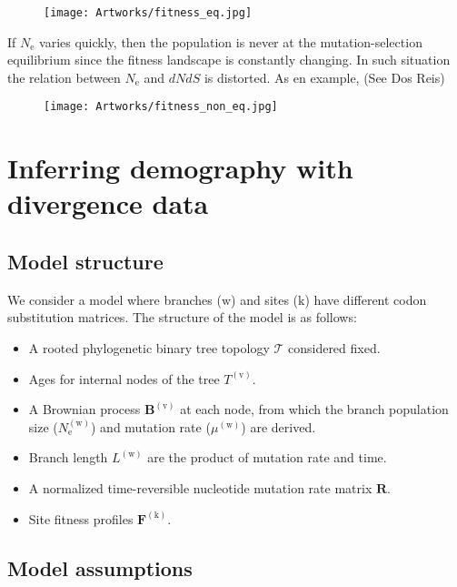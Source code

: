 \documentclass{article}
\newcommand{\site}{\text{k}}
\newcommand{\branch}{\text{w}}
\newcommand{\node}{\text{v}}
\newcommand{\e}{\mathrm{e}}
\newcommand{\Ne}{N_\e}
\newcommand{\dnds}{dNdS}
\newcommand{\Tree}{\mathcal{T}}
\newcommand{\brownian}{\bm{B}}
\newcommand{\mutmatrix}{R}
\newcommand{\Mutmatrix}{\bm{\mutmatrix}}
\begin{document}
\begin{figure}[H]
	\centering
	\texttt{[image: Artworks/fitness\_eq.jpg]}
\end{figure}

If $\Ne$ varies quickly, then the population is never at the mutation-selection equilibrium since the fitness landscape is constantly changing.
In such situation the relation between $\Ne$ and $\dnds$ is distorted.
As en example,  (See Dos Reis)

\begin{figure}[H]
	\centering
	\texttt{[image: Artworks/fitness\_non\_eq.jpg]}
\end{figure}

\section{Inferring demography with divergence data}

\subsection{Model structure}
We consider a model where branches ($\branch$) and sites ($\site$) have different codon substitution matrices. The structure of the model is as follows:
\begin{itemize}
	\setlength\itemsep{-0.25em}
	\item A rooted phylogenetic binary tree topology $\Tree$ considered fixed.
	\item Ages for internal nodes of the tree $T^{(\node)}$.
	\item A Brownian process $\brownian^{(\node)}$ at each node, from which the branch population size ($\Ne^{(\branch)}$) and mutation rate ($\mu^{(\branch)}$) are derived.
	\item Branch length $L^{(\branch)}$ are the product of mutation rate and time.
	\item A normalized time-reversible nucleotide mutation rate matrix $\Mutmatrix$.
	\item Site fitness profiles $\bm{F}^{(\site)}$.
\end{itemize}

\subsection{Model assumptions}
\end{document}
